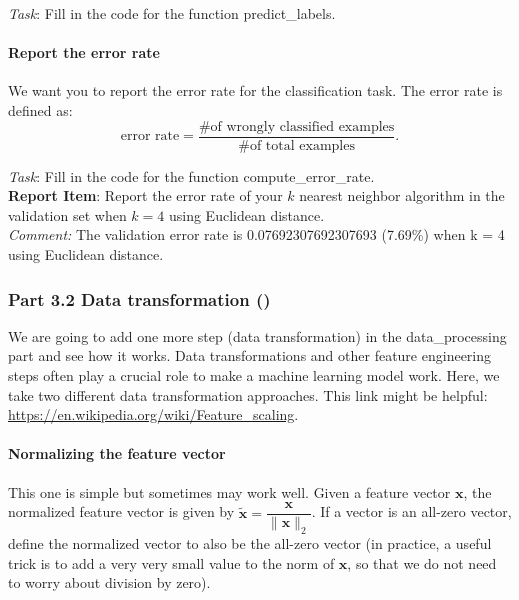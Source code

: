 \noindent \emph{Task}: Fill in the code for the function \colorbox{Gainsboro!60!Lavender}{predict\_labels}.

\paragraph{Report the error rate}
We want you to report the error rate for the classification task. The error rate is defined as:
\begin{equation}
    \text{error rate} = \dfrac{\text{\# of wrongly classified examples}}{\text{\# of total examples}}.
\end{equation}

\noindent \emph{Task}: Fill in the code for the function \colorbox{Gainsboro!60!Lavender}{compute\_error\_rate}.\\

\noindent \textbf{Report Item}: Report the error rate of your $k$ nearest neighbor algorithm in the validation set when $k=4$ using Euclidean distance.\\

\textit{Comment:} The validation error rate is 0.07692307692307693 (7.69\%) when k = 4 using Euclidean distance.

\subsubsection*{Part 3.2 Data transformation ()}
We are going to add one more step (data transformation) in the \colorbox{Gainsboro!60!Lavender}{data\_processing} part and see how it works. Data transformations and other feature engineering steps often play a crucial role to make a machine learning model work.  Here, we take two different data transformation approaches. This link might be helpful: \url{https://en.wikipedia.org/wiki/Feature_scaling}.

\paragraph{Normalizing the feature vector}
This one is simple but sometimes may work well. Given a feature vector $\mathbf{x}$, the normalized feature vector is given by $\mathbf{\tilde{x}}=\dfrac{\mathbf{x}}{\|\mathbf{x}\|_2}$. If a vector is an all-zero vector, define the normalized vector to also be the all-zero vector (in practice, a useful trick is to add a very very small value to the norm of $\mathbf{x}$, so that we do not need to worry about  division by zero).

